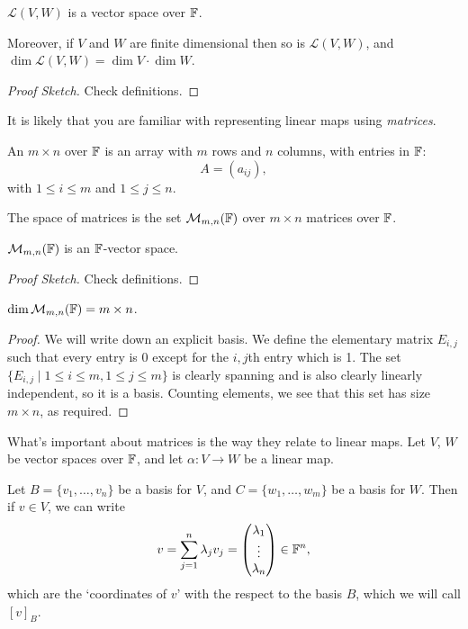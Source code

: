 \documentclass[a4paper]{scrartcl}
\begin{document}
\begin{proposition}
    $\mathcal{L}(V, W)$ is a vector space over $\mathbb{F}$.
    
    Moreover, if $V$ and $W$ are finite dimensional then so is $\mathcal{L}(V, W)$, and $\dim \mathcal{L}(V, W) = \dim V \cdot \dim W$.
\end{proposition}
\begin{proof}[Proof Sketch]
    Check definitions.
\end{proof}


It is likely that you are familiar with representing linear maps using \emph{matrices}.

\begin{definition}[Matrix]
    An $m \times n$  over $\mathbb{F}$ is an array with $m$ rows and $n$ columns, with entries in $\mathbb{F}$:
    $$
    A = (a_{ij}),
    $$
    with $1 \leq i \leq m$ and $1 \leq j \leq n$.

    The space of matrices is the set $\mathcal{M}_{m,n}(\mathbb{F})$ over $m \times n$ matrices over $\mathbb{F}$.
\end{definition}

\begin{proposition}
    $\mathcal{M}_{m, n}(\mathbb{F})$ is an $\mathbb{F}$-vector space.
\end{proposition}
\begin{proof}[Proof Sketch]
    Check definitions.
\end{proof}

\begin{proposition}
    $\dim \mathcal{M}_{m, n}(\mathbb{F}) = m \times n$.
\end{proposition}
\begin{proof}
    We will write down an explicit basis. We define the elementary matrix $E_{i,j}$ such that every entry is $0$ except for the $i, j$th entry which is 1.
    The set $\{E_{i, j} \mid 1 \leq i \leq m, 1 \leq j \leq m\}$ is clearly spanning and is also clearly linearly independent, so it is a basis. Counting elements, we see that this set has size $m \times n$, as required.
\end{proof}

What's important about matrices is the way they relate to linear maps. Let $V$, $W$ be vector spaces over $\mathbb{F}$, and let $\alpha: V \rightarrow W$ be a linear map. 

Let $B = \{v_1, \dots, v_n\}$ be a basis for $V$, and $C = \{w_1, \dots, w_m\}$ be a basis for $W$. Then if $v \in V$, we can write
$$
v = \sum_{j = 1}^n \lambda_j v_j = \begin{pmatrix}
    \lambda_1 \\ \vdots \\ \lambda_n
\end{pmatrix} \in \mathbb{F}^n,
$$
which are the `coordinates of $v$' with the respect to the basis $B$, which we will call $[v]_B$.
\end{document}
